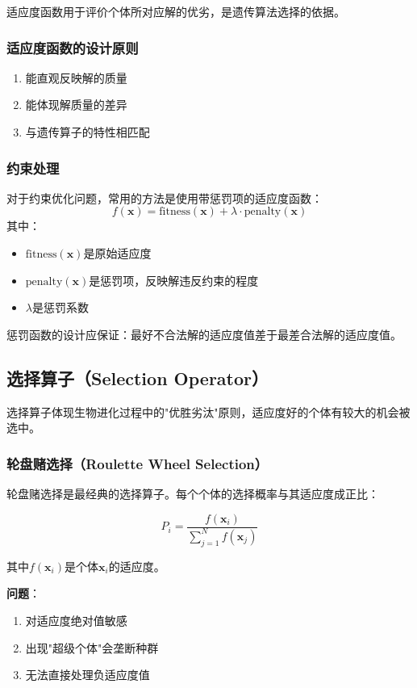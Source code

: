 适应度函数用于评价个体所对应解的优劣，是遗传算法选择的依据。

\subsubsection{适应度函数的设计原则}
\begin{enumerate}
    \item 能直观反映解的质量
    \item 能体现解质量的差异
    \item 与遗传算子的特性相匹配
\end{enumerate}

\subsubsection{约束处理}
对于约束优化问题，常用的方法是使用带惩罚项的适应度函数：
\[
f(\mathbf{x}) = \text{fitness}(\mathbf{x}) + \lambda \cdot \text{penalty}(\mathbf{x})
\]
其中：
\begin{itemize}
    \item $\text{fitness}(\mathbf{x})$是原始适应度
    \item $\text{penalty}(\mathbf{x})$是惩罚项，反映解违反约束的程度
    \item $\lambda$是惩罚系数
\end{itemize}

惩罚函数的设计应保证：最好不合法解的适应度值差于最差合法解的适应度值。

\subsection{选择算子（Selection Operator）}

选择算子体现生物进化过程中的"优胜劣汰"原则，适应度好的个体有较大的机会被选中。

\subsubsection{轮盘赌选择（Roulette Wheel Selection）}

轮盘赌选择是最经典的选择算子。每个个体的选择概率与其适应度成正比：

\[
P_i = \frac{f(\mathbf{x}_i)}{\sum_{j=1}^{N} f(\mathbf{x}_j)}
\]

其中$f(\mathbf{x}_i)$是个体$\mathbf{x}_i$的适应度。

\textbf{问题}：
\begin{enumerate}
    \item 对适应度绝对值敏感
    \item 出现"超级个体"会垄断种群
    \item 无法直接处理负适应度值
\end{enumerate}

